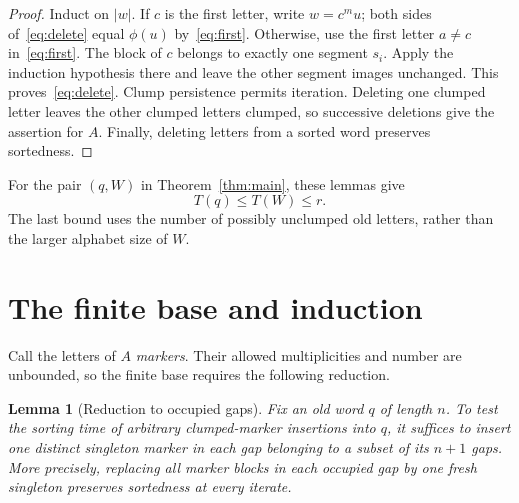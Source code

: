 \documentclass[11pt,a4paper]{article}
\newtheorem{lemma}[theorem]{Lemma}
\begin{document}
\begin{proof}
Induct on $|w|$. If $c$ is the first letter, write $w=c^m u$; both sides
of~\eqref{eq:delete} equal $\phi(u)$ by~\eqref{eq:first}. Otherwise, use
the first letter $a\ne c$ in~\eqref{eq:first}. The block of $c$ belongs to
exactly one segment $s_i$. Apply the induction hypothesis there and leave
the other segment images unchanged. This proves~\eqref{eq:delete}.
Clump persistence permits iteration. Deleting one clumped letter leaves
the other clumped letters clumped, so successive deletions give the assertion
for $A$. Finally, deleting letters from a sorted word preserves sortedness.
\end{proof}

For the pair $(q,W)$ in Theorem~\ref{thm:main}, these lemmas give
\begin{equation}\label{eq:bounds}
 T(q)\leq T(W)\leq r.
\end{equation}
The last bound uses the number of possibly unclumped old letters, rather
than the larger alphabet size of $W$.

\section{The finite base and induction}

Call the letters of $A$ \emph{markers}. Their allowed multiplicities and
number are unbounded, so the finite base requires the following reduction.

\begin{lemma}[Reduction to occupied gaps]\label{lem:gaps}
Fix an old word $q$ of length $n$. To test the sorting time of arbitrary
clumped-marker insertions into $q$, it suffices to insert one distinct
singleton marker in each gap belonging to a subset of its $n+1$ gaps.
More precisely, replacing all marker blocks in each occupied gap by one
fresh singleton preserves sortedness at every iterate.
\end{lemma}
\end{document}
